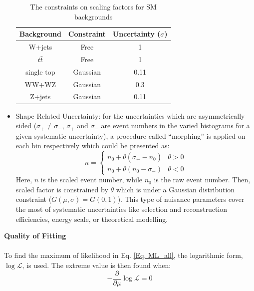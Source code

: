 \begin{itemize}
	\begin{table}[h]
		\caption{The constraints on scaling factors for SM backgrounds}
		\renewcommand{\arraystretch}{1.3}
		\centering
		\begin{tabular}{| c | c | c |  }
			\hline
			\hline
			Background      &     Constraint     & Uncertainty ($\sigma$)   \\
			\hline
			W+jets          &     Free           & 1                          \\
			\hline
			$t\bar{t}$      &     Free           & 1                          \\
			\hline
			single top      &     Gaussian       & 0.11                        \\
			\hline
			WW+WZ           &     Gaussian       & 0.3                         \\
			\hline
			Z+jets          &     Gaussian       & 0.11                        \\
			\hline
		\end{tabular}
	\label{Tab:constaints}
    \end{table}

	\item Shape Related Uncertainty: for the uncertainties which are asymmetrically sided ($\sigma_{+}\neq\sigma_{-}$, $\sigma_+$ and $\sigma_-$ are event numbers in the varied histograms for a given systematic uncertainty), a procedure called ``morphing'' is applied on each bin respectively which could be presented as:
    \begin{equation}
    n =
    \begin{cases}
    n_0+ \theta(\sigma_{+}-n_0) & \theta>0 \\
    n_0+ \theta(n_0-\sigma_{-}) & \theta<0
    \end{cases}
    \end{equation}
    Here, $n$ is the scaled event number, while $n_0$ is the raw event number. Then, scaled factor is constrained by $\theta$ which is under a Gaussian distribution constraint ($G(\mu, \sigma)=G(0,1)$). This type of nuisance parameters cover the most of systematic uncertainties like selection and reconstruction efficiencies, energy scale, or theoretical modelling. 
\end{itemize}
\noindent
{\bf Quality of Fitting}
\\
\\To find the maximum of likelihood in Eq. \ref{Eq. ML_all}, the logarithmic form, $\log{\mathcal{L}}$, is used. The extreme value is then found when:
\begin{equation}
-\frac{\partial}{\partial\mu}\log{\mathcal{L}} = 0
\end{equation}
